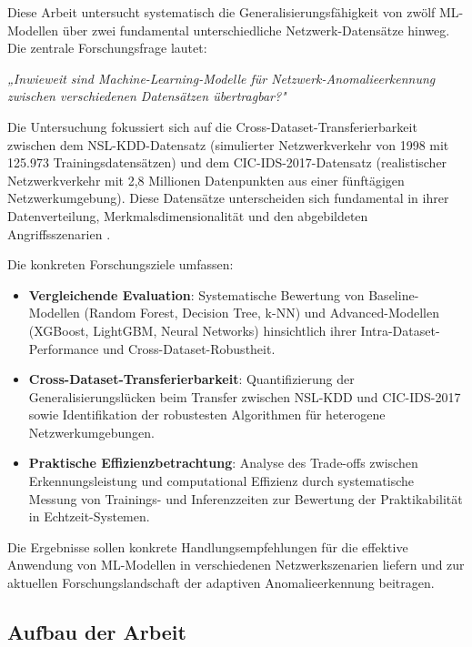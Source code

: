 \documentclass[11pt,a4paper]{article}
\begin{document}
    Diese Arbeit untersucht systematisch die Generalisierungsfähigkeit von zwölf ML-Modellen über zwei fundamental unterschiedliche Netzwerk-Datensätze hinweg. Die zentrale Forschungsfrage lautet:

    \textit{„Inwieweit sind Machine-Learning-Modelle für Netzwerk-Anomalieerkennung zwischen verschiedenen Datensätzen übertragbar?"}

    Die Untersuchung fokussiert sich auf die Cross-Dataset-Transferierbarkeit zwischen dem NSL-KDD-Datensatz \parencite{NSLKDD2024} (simulierter Netzwerkverkehr von 1998 mit 125.973 Trainingsdatensätzen) und dem CIC-IDS-2017-Datensatz \parencite{CICIDS2017,Sharafaldin2018} (realistischer Netzwerkverkehr mit 2,8 Millionen Datenpunkten aus einer fünftägigen Netzwerkumgebung). Diese Datensätze unterscheiden sich fundamental in ihrer Datenverteilung, Merkmalsdimensionalität und den abgebildeten Angriffsszenarien \parencite{Mourouzis2021}.

    Die konkreten Forschungsziele umfassen:

    \begin{itemize}
        \item \textbf{Vergleichende Evaluation}: Systematische Bewertung von Baseline-Modellen (Random Forest, Decision Tree, k-NN) und Advanced-Modellen (XGBoost, LightGBM, Neural Networks) hinsichtlich ihrer Intra-Dataset-Performance und Cross-Dataset-Robustheit.
        \item \textbf{Cross-Dataset-Transferierbarkeit}: Quantifizierung der Generalisierungslücken beim Transfer zwischen NSL-KDD und CIC-IDS-2017 sowie Identifikation der robustesten Algorithmen für heterogene Netzwerkumgebungen.
        \item \textbf{Praktische Effizienzbetrachtung}: Analyse des Trade-offs zwischen Erkennungsleistung und computational Effizienz durch systematische Messung von Trainings- und Inferenzzeiten zur Bewertung der Praktikabilität in Echtzeit-Systemen.
    \end{itemize}

    Die Ergebnisse sollen konkrete Handlungsempfehlungen für die effektive Anwendung von ML-Modellen in verschiedenen Netzwerkszenarien liefern und zur aktuellen Forschungslandschaft der adaptiven Anomalieerkennung beitragen.

    \subsection{Aufbau der Arbeit}
\end{document}
